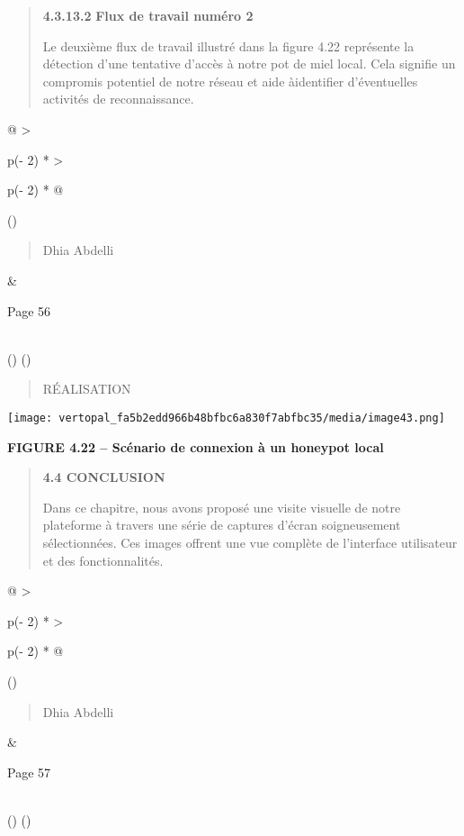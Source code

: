 \documentclass[
]{article}
\begin{document}
\begin{quote}
\textbf{4.3.13.2} \textbf{Flux de travail numéro 2}

Le deuxième flux de travail illustré dans la figure 4.22 représente la
détection d'une tentative d'accès à notre pot de miel local. Cela
signifie un compromis potentiel de notre réseau et aide àidentifier
d'éventuelles activités de reconnaissance.
\end{quote}

\begin{longtable}[]{@{}
  >{\raggedright\arraybackslash}p{(\columnwidth - 2\tabcolsep) * }
  >{\raggedright\arraybackslash}p{(\columnwidth - 2\tabcolsep) * }@{}}
\toprule()
\begin{minipage}[b]{\linewidth}\raggedright
\begin{quote}
Dhia Abdelli
\end{quote}
\end{minipage} & \begin{minipage}[b]{\linewidth}\raggedright
Page 56
\end{minipage} \\
\midrule()
\endhead
\bottomrule()
\end{longtable}

\begin{quote}
RÉALISATION
\end{quote}

\texttt{[image: vertopal\_fa5b2edd966b48bfbc6a830f7abfbc35/media/image43.png]}

\textbf{FIGURE 4.22 -- Scénario de connexion à un honeypot local}

\begin{quote}
\textbf{4.4 CONCLUSION}

Dans ce chapitre, nous avons proposé une visite visuelle de notre
plateforme à travers une série de captures d'écran soigneusement
sélectionnées. Ces images offrent une vue complète de l'interface
utilisateur et des fonctionnalités.
\end{quote}

\begin{longtable}[]{@{}
  >{\raggedright\arraybackslash}p{(\columnwidth - 2\tabcolsep) * }
  >{\raggedright\arraybackslash}p{(\columnwidth - 2\tabcolsep) * }@{}}
\toprule()
\begin{minipage}[b]{\linewidth}\raggedright
\begin{quote}
Dhia Abdelli
\end{quote}
\end{minipage} & \begin{minipage}[b]{\linewidth}\raggedright
Page 57
\end{minipage} \\
\midrule()
\endhead
\bottomrule()
\end{longtable}
\end{document}
